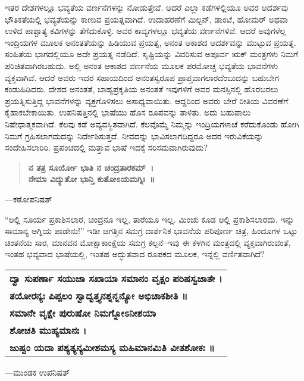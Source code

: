 ಇತರ ದೇಶಗಳಲ್ಲೂ ಭವ್ಯತೆಯ ವರ್ಣನೆಗಳನ್ನು ನೋಡುತ್ತೇವೆ. ಆದರೆ ಎಲ್ಲಾ ಕಡೆಗಳಲ್ಲಿಯೂ ಅವರ ಆದರ್ಶವು ಭೌತಿಕತೆಯಲ್ಲಿ ಭವ್ಯತೆಯನ್ನು ಕಾಣುವ ಪ್ರಯತ್ನವಾಗಿದೆ. ಉದಾಹರಣೆಗೆ ಮಿಲ್ಟನ್​, ಡಾಂಟೆ, ಹೋಮರ್​ ಅಥವಾ ಉಳಿದ ಪಾಶ್ಚಾತ್ಯ ಕವಿಗಳನ್ನು ತೆಗೆದುಕೊಳ್ಳಿ. ಅವರ ಕಾವ್ಯಗಳಲ್ಲೂ ಭವ್ಯತೆಯ ವರ್ಣನೆಗಳಿವೆ. ಆದರೆ ಅವುಗಳೆಲ್ಲ ಇಂದ್ರಿಯಗಳ ಮೂಲಕ ಅನಂತತೆಯನ್ನು ಹಿಡಿಯುವ ಪ್ರಯತ್ನ, ಅನಂತ ಆಕಾಶದ ಆದರ್ಶವನ್ನು ಮುಟ್ಟುವ ಪ್ರಯತ್ನ. ಸಂಹಿತೆಯ ಭಾಗದಲ್ಲಿಯೂ ಅದೇ ಪ್ರಯತ್ನ ನಡೆದಿದೆ. ಸೃಷ್ಟಿಯನ್ನು ವಿವರಿಸುವ ಅಪೂರ್ವ ಋಕ್​ ಮಂತ್ರಗಳು ನಿಮಗೆ ಪರಿಚಿತವಾಗಿರಬಹುದು. ಅಲ್ಲಿ ಅನಂತ ಆಕಾಶದ ವರ್ಣನೆಯ ಮೂಲಕ ಪರಮೋಚ್ಚ ಭವ್ಯತೆಯ ಭಾವನೆಗಳು ವ್ಯಕ್ತವಾಗಿವೆ. ಆದರೆ ಅವರು ಇದರ ಸಹಾಯದಿಂದ ಅನಂತಸ್ವರೂಪ ಪ್ರಾಪ್ತವಾಗಲಾರದೆಂಬುದನ್ನು ಬಹುಬೇಗ ಕಂಡುಹಿಡಿದರು. ದೇಶದ ಅನಂತತೆ, ಬಾಹ್ಯಪ್ರಕೃತಿಯ ಅನಂತತೆ ಇವುಗಳಿಗೆ ಅವರ ಮನಸ್ಸಿನಲ್ಲಿ ಹೊರಬರಲು ಪ್ರಯತ್ನಿಸುತ್ತಿದ್ದ ಭಾವನೆಗಳನ್ನು ವ್ಯಕ್ತಗೊಳಿಸಲು ಅಸಾಧ್ಯವಾಯಿತು. ಆದ್ದರಿಂದ ಅವರು ಬೇರೆ ರೀತಿಯ ವಿವರಣೆಗೆ ಕೈಹಾಕಬೇಕಾಯಿತು. ಉಪನಿಷತ್ತಿನಲ್ಲಿ ಭಾಷೆಯು ಹೊಸ ರೂಪವನ್ನು ತಾಳಿತು. ಅದು ಬಹುಪಾಲು ನಿಷೇಧಾತ್ಮಕವಾಗಿದೆ. ಕೆಲವು ಕಡೆ ಅವ್ಯವಸ್ಥಿತವಾಗಿದೆ. ಕೆಲವೊಮ್ಮೆ ನಿಮ್ಮನ್ನು ಇಂದ್ರಿಯಗಳಾಚೆ ಕರೆದುಕೊಂಡು ಹೋಗಿ ನಿಮಗೆ ಗ್ರಹಿಸಲಾಗದುದನ್ನು ನಿರ್ದೇಶಿಸುತ್ತದೆ. ನೀವದನ್ನು ಭಾವಿಸಲಾಗದಿದ್ದರೂ ಅದರ ಇರುವಿಕೆಯನ್ನು ಸಂದೇಹಿಸಲಾರಿರಿ. ಪ್ರಪಂಚದಲ್ಲಿ ಮತ್ತಾವ ಭಾಷೆ ಇದಕ್ಕೆ ಸರಿಸಮವಾಗಿರುವುದು?

\begin{verse}
\textbf{ನ ತತ್ರ ಸೂರ್ಯೋ ಭಾತಿ ನ ಚಂದ್ರತಾರಕಮ್​~।}\\\textbf{ನೇಮಾ ವಿದ್ಯುತೋ ಭಾನ್ತಿ ಕುತೋಽಯಮಗ್ನಿಃ~॥}
\end{verse}

\hfill —ಕಠೋಪನಿಷತ್​

“ಅಲ್ಲಿ ಸೂರ್ಯ ಪ್ರಕಾಶಿಸಲಾರ, ಚಂದ್ರನೂ ಇಲ್ಲ, ತಾರೆಯೂ ಇಲ್ಲ. ಮಿಂಚು ಕೂಡ ಅಲ್ಲಿ ಪ್ರಕಾಶಿಸಲಾರದು. ಇನ್ನು ಸಾಮಾನ್ಯ ಅಗ್ನಿಯ ಪಾಡೇನು!” ಇಡೀ ಜಗತ್ತಿನ ಸಮಗ್ರ ದಾರ್ಶನಿಕ ಭಾವನೆಯ ಪರಿಪೂರ್ಣ ಚಿತ್ರ, ಹಿಂದೂಗಳ ಒಟ್ಟು ಚಿಂತನೆಯ ಸಾರ, ಮಾನವನ ಮೋಕ್ಷಾಕಾಂಕ್ಷೆಯ ಸಮಗ್ರ ಕಲ್ಪನೆ–ಇವು ಈ ಕೆಳಗಿನ ಮಂತ್ರದಲ್ಲಿ ವ್ಯಕ್ತವಾಗಿರುವಂತೆ, ಇಂತಹ ಭವ್ಯವಾದ ಭಾಷೆಯಲ್ಲಿ, ಇಂತಹ ಅದ್ಭುತವಾದ ರೂಪಕದ ಮೂಲಕ, ಇನ್ನೆಲ್ಲಿ ವರ್ಣಿತವಾಗಿದೆ?

\begin{longtable}{@{\hspace{-18pt}}l@{}}
\textbf{ದ್ವಾ ಸುಪರ್ಣಾ ಸಯುಜಾ ಸಖಾಯಾ ಸಮಾನಂ ವೃಕ್ಷಂ ಪರಿಷಸ್ವಜಾತೇ ।} \\
\textbf{ತಯೋರನ್ಯಃ ಪಿಪ್ಪಲಂ ಸ್ವಾದ್ವತ್ತ್ಯನಶ್ನನ್ನನ್ಯೋ ಅಭಿಚಾಕಶೀತಿ ॥} \\
\textbf{ಸಮಾನೇ ವೃಕ್ಷೇ ಪುರುಷೋ ನಿಮಗ್ನೋಽನೀಶಯಾ} \\
\textbf{ಶೋಚತಿ ಮುಹ್ಯಮಾನಃ ।} \\
\textbf{ಜುಷ್ಟಂ ಯದಾ ಪಶ್ಯತ್ಯನ್ಯಮೀಶಮಸ್ಯ ಮಹಿಮಾನಮಿತಿ ವೀತಶೋಕಃ ॥} \\
\end{longtable}

\hfill —ಮುಂಡಕ ಉಪನಿಷತ್​

